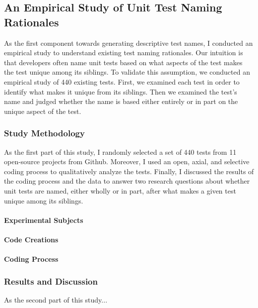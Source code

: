 \subsection{An Empirical Study of Unit Test Naming Rationales}
\label{sec:emp-study}

As the first component towards generating descriptive test names, I conducted an empirical study to understand existing test naming rationales.
%
Our intuition is that developers often name unit tests based on what aspects of the test makes the test unique among its siblings.
%
To validate this assumption, we conducted an empirical study of \num{440} existing tests.
%
First, we examined each test in order to identify what makes it unique from its siblings.
%
Then we examined the test’s name and judged whether the name is based either entirely or in part on the unique aspect of the test.


\subsubsection{Study Methodology}

As the first part of this study, I randomly selected a set of \num{440} tests from \num{11} open-source projects from Github.
%
Moreover, I used an open, axial, and selective coding process to qualitatively analyze the tests.
%
Finally, I discussed the results of the coding process and the data to answer two research questions about whether unit tests are named, either wholly or in part, after what makes a given test unique among its siblings.

\paragraph{Experimental Subjects}


\paragraph{Code Creations}


\paragraph{Coding Process}


\subsubsection{Results and Discussion}

As the second part of this study...

